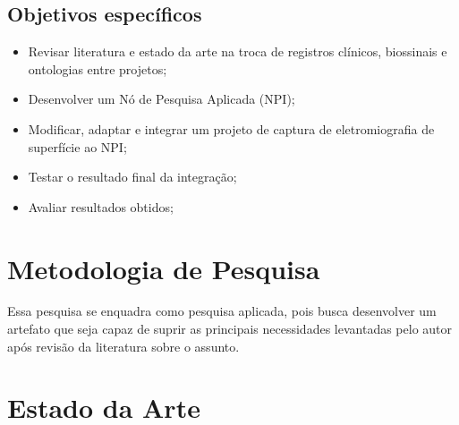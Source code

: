 \subsection{Objetivos específicos}\label{subsec:objetivosEspecificos}

\begin{itemize}
  \item Revisar literatura e estado da arte na troca de registros clínicos, biossinais e ontologias entre projetos;
  \item Desenvolver um Nó de Pesquisa Aplicada (NPI);
  \item Modificar, adaptar e integrar um projeto de captura de eletromiografia de superfície ao NPI;
  \item Testar o resultado final da integração; 
  \item Avaliar resultados obtidos;
\end{itemize}

\section{Metodologia de Pesquisa}\label{sec:MetodologiaDePesquisa}

Essa pesquisa se enquadra como pesquisa aplicada, pois busca desenvolver um artefato que seja capaz de suprir as principais necessidades levantadas pelo autor após revisão da literatura sobre o assunto.

\section{Estado da Arte}\label{sec:estadoDaArte}

